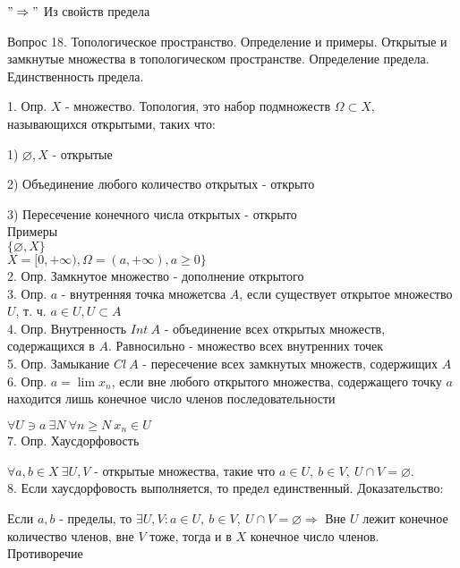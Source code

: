 \documentclass[12pt]{article}
\begin{document}
$"\Rightarrow"$ Из свойств предела
\newpage

\begin{center}
Вопрос 18. Топологическое пространство. Определение и примеры. Открытые и замкнутые множества в топологическом пространстве. Определение предела. Единственность предела.
\end{center}

1. Опр. $X$ - множество. Топология, это набор подмножеств $\Omega \subset X$, называющихся открытыми, таких что:

1) $\varnothing, X$ - открытые
  
2) Объединение любого количество открытых - открыто
  
3) Пересечение конечного числа открытых - открыто\\
  
Примеры\\
$\{\varnothing, X\}$\\
$X = [0, +\infty), \Omega = (a, +\infty), a\geq 0\}$\\

2. Опр. Замкнутое множество - дополнение открытого\\

3. Опр. $a$ - внутренняя точка множетсва $A$, если существует открытое множество $U$, т. ч. $a \in U, U\subset A$\\

4. Опр. Внутренность $Int\ A$ - объединение всех открытых множеств, содержащихся в $A$. Равносильно - множество всех внутренних точек\\

5. Опр. Замыкание $Cl\ A$ - пересечение всех замкнутых множеств, содержищих $A$\\

6. Опр. $a = \lim x_n$, если вне любого открытого множества, содержащего точку $a$ находится лишь конечное число членов последовательности

$\forall U \ni a\ \exists N\ \forall n\geq N\ x_n \in U$\\

7. Опр. Хаусдорфовость

$\forall a, b \in X \ \exists U, V$ - открытые множества, такие что $a\in U,\ b\in V,\ U\cap V = \varnothing$.\\

8. Если хаусдорфовость выполняется, то предел единственный. Доказательство:

Если $a, b$ - пределы, то $\exists U, V : a\in U,\ b\in V,\ U\cap V = \varnothing \Rightarrow $ Вне $U$ лежит конечное количество членов, вне $V$ тоже, тогда и в $X$ конечное число членов. Противоречие
\newpage
\end{document}

